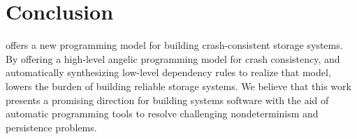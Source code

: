 \section{Conclusion}\label{s:conclusion}

\depsynth offers a new programming model for building crash-consistent storage systems.
By offering a high-level angelic programming model for crash consistency,
and automatically synthesizing low-level dependency rules to realize that model,
\depsynth lowers the burden of building reliable storage systems.
We believe that this work presents a promising direction for building systems software
with the aid of automatic programming tools
to resolve challenging nondeterminism and persistence problems.
